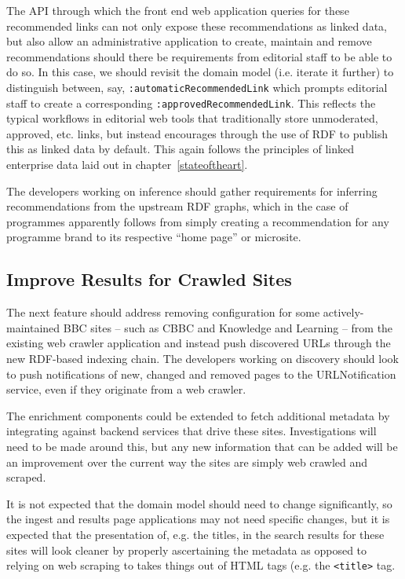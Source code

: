 The API through which the front end web application queries for
these recommended links can not only expose these recommendations
as linked data, but also allow an administrative application
to create, maintain and remove recommendations should there
be requirements from editorial staff to be able to do so. In this
case, we should revisit the domain model (i.e. iterate it further)
to distinguish between, say, \texttt{:automaticRecommendedLink}
which prompts editorial staff to create a corresponding
\texttt{:approvedRecommendedLink}. This reflects the typical
workflows in editorial web tools that traditionally store unmoderated,
approved, etc. links, but instead encourages through the use of RDF
to publish this as linked data by default. This again follows the
principles of linked enterprise data laid out in chapter~\ref{stateoftheart}.

The developers working on inference should gather requirements
for inferring recommendations from the upstream RDF graphs,
which in the case of programmes apparently follows from simply
creating a recommendation for any programme brand to its
respective ``home page'' or microsite.

\subsection{Improve Results for Crawled Sites}

The next feature should address removing configuration for
some actively-maintained BBC sites -- such as CBBC and
Knowledge and Learning -- from the existing web crawler
application and instead push discovered URLs through the new
RDF-based indexing chain. The developers working on discovery
should look to push notifications of new, changed and removed
pages to the URLNotification service, even if they originate
from a web crawler.

The enrichment components could be extended to fetch additional
metadata by integrating against backend services that drive
these sites. Investigations will need to be made around this,
but any new information that can be added will be an improvement
over the current way the sites are simply web crawled and scraped.

It is not expected that the domain model should need to change
significantly, so the ingest and results page applications may not
need specific changes, but it is expected that the presentation
of, e.g. the titles, in the search results for these sites will look
cleaner by properly ascertaining the metadata as opposed to relying
on web scraping to takes things out of HTML tags (e.g. the \texttt{<title>}
tag.


